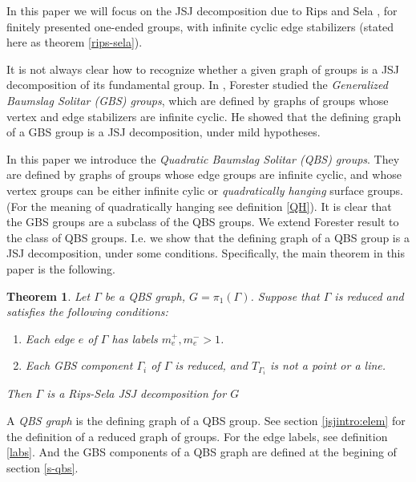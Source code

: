 \documentclass[12pt]{amsart}
\newtheorem{theorem}{Theorem}[section]
\begin{document}

In this paper we will focus on the JSJ decomposition due to Rips and Sela \cite{ripsela}, for finitely presented one-ended groups, with infinite cyclic edge stabilizers (stated here as theorem \ref{rips-sela}).


It is not always clear how to recognize whether a given graph of groups is a JSJ decomposition of its fundamental group. In \cite{forester}, Forester studied the {\em Generalized Baumslag Solitar (GBS) groups}, which are defined by graphs of groups whose vertex and edge stabilizers are infinite cyclic. He showed that the defining graph of a GBS group is a JSJ decomposition, under mild hypotheses. 

In this paper we introduce the {\em Quadratic Baumslag Solitar (QBS) groups}.  They are defined by graphs of groups whose edge groups are infinite cyclic, and whose vertex groups can be either infinite cylic or {\em quadratically hanging} surface groups. (For the meaning of quadratically hanging see definition \ref{QH}). It is clear that the GBS groups are a subclass of the QBS groups. We extend Forester result to the class of QBS groups. I.e. we show that the defining graph of a QBS group is a JSJ decomposition, under some conditions. Specifically, the main theorem in this paper is the following.

\begin{theorem} \label{jsj} Let $\Gamma$ be a QBS graph, $G=\pi_1(\Gamma)$. Suppose that $\Gamma$ is reduced and satisfies the following conditions:
\begin{enumerate}
\item Each edge $e$ of $\Gamma$ has labels $m_e^+,m_e^->1$.
\item Each GBS component $\Gamma_i$ of $\Gamma$ is reduced, and $T_{\Gamma_i}$ is not a point or a line.   
\end{enumerate}
Then $\Gamma$ is a Rips-Sela JSJ decomposition for $G$
\end{theorem}

A {\em QBS graph} is the defining graph of a QBS group. See section \ref{jsjintro:elem} for the definition of a reduced graph of groups. For the edge labels, see definition \ref{labs}. And the GBS components of a QBS graph are defined at the begining of section \ref{s-qbs}.  

\end{document}
